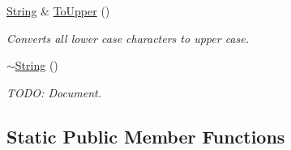 \begin{DoxyCompactItemize}
\hyperlink{class_power_1_1_string}{String} \& \hyperlink{class_power_1_1_string_a032aabe48ca5b95b9e089998fb8806fa}{To\+Upper} ()
\begin{DoxyCompactList}\small\item\em Converts all lower case characters to upper case. \end{DoxyCompactList}\item 
\hyperlink{class_power_1_1_string_af3e98839735047cdb9362232836fd773}{$\sim$\+String} ()
\begin{DoxyCompactList}\small\item\em T\+O\+DO\+: Document. \end{DoxyCompactList}\end{DoxyCompactItemize}
\subsection*{Static Public Member Functions}
